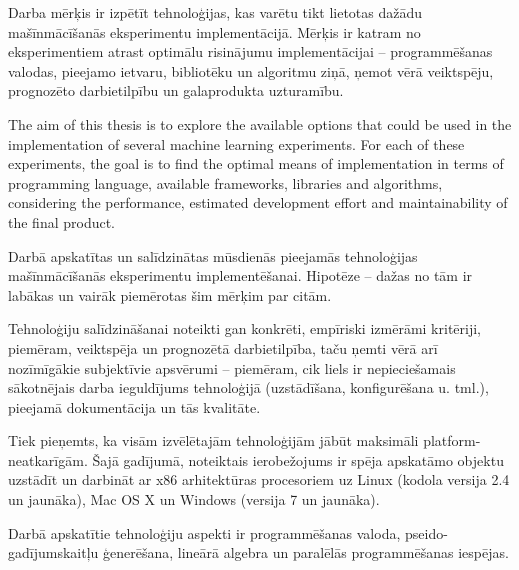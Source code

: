 \documentclass{ludis}
\begin{document}
\maketitle

\begin{abstract-lv}
  Darba mērķis ir izpētīt tehnoloģijas, kas varētu tikt lietotas dažādu mašīnmācīšanās eksperimentu implementācijā. Mērķis ir katram no eksperimentiem atrast optimālu risinājumu implementācijai -- programmēšanas valodas, pieejamo ietvaru, bibliotēku un algoritmu ziņā, ņemot vērā veiktspēju, prognozēto darbietilpību un galaprodukta uzturamību.
\end{abstract-lv}

\begin{abstract-en}
  The aim of this thesis is to explore the available options that could be used in the implementation of several machine learning experiments. For each of these experiments, the goal is to find the optimal means of implementation in terms of programming language, available frameworks, libraries and algorithms, considering the performance, estimated development effort and maintainability of the final product.
\end{abstract-en}

\tableofcontents

Darbā apskatītas un salīdzinātas mūsdienās pieejamās tehnoloģijas mašīnmācīšanās eksperimentu implementēšanai. Hipotēze -- dažas no tām ir labākas un vairāk piemērotas šim mērķim par citām.

Tehnoloģiju salīdzināšanai noteikti gan konkrēti, empīriski izmērāmi kritēriji, piemēram, veiktspēja un prognozētā darbietilpība, taču ņemti vērā arī nozīmīgākie subjektīvie apsvērumi -- piemēram, cik liels ir nepieciešamais sākotnējais darba ieguldījums tehnoloģijā (uzstādīšana, konfigurēšana u. tml.), pieejamā dokumentācija un tās kvalitāte.

Tiek pieņemts, ka visām izvēlētajām tehnoloģijām jābūt maksimāli platform-neatkarīgām. Šajā gadījumā, noteiktais ierobežojums ir spēja apskatāmo objektu uzstādīt un darbināt ar x86 arhitektūras procesoriem uz Linux (kodola versija 2.4 un jaunāka), Mac OS X un Windows (versija 7 un jaunāka).

Darbā apskatītie tehnoloģiju aspekti ir programmēšanas valoda, pseido-gadījumskaitļu ģenerēšana, lineārā algebra un paralēlās programmēšanas iespējas.
\end{document}
